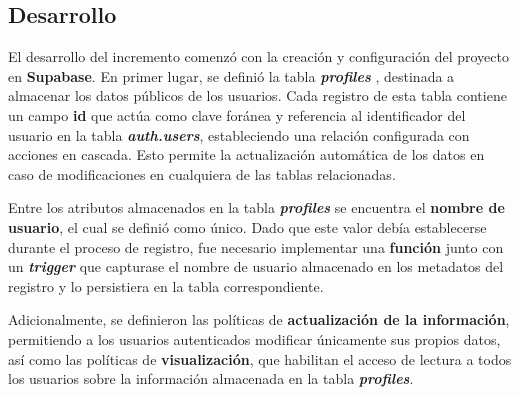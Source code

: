 
\subsection{Desarrollo}
El desarrollo del incremento comenzó con la creación y configuración del proyecto en \textbf{Supabase}. En primer lugar, se definió la tabla \textbf{\textit{profiles}} , destinada a almacenar los datos públicos de los usuarios. Cada registro de esta tabla contiene un campo \textbf{id} que actúa como clave foránea y referencia al identificador del usuario en la tabla \textbf{\textit{auth.users}}, estableciendo una relación configurada con acciones en cascada. Esto permite la actualización automática de los datos en caso de modificaciones en cualquiera de las tablas relacionadas.

Entre los atributos almacenados en la tabla \textbf{\textit{profiles}} se encuentra el \textbf{nombre de usuario}, el cual se definió como único. Dado que este valor debía establecerse durante el proceso de registro, fue necesario implementar una \textbf{función}  junto con un \textbf{\textit{trigger}}  que capturase el nombre de usuario almacenado en los metadatos del registro y lo persistiera en la tabla correspondiente.

Adicionalmente, se definieron las políticas  de \textbf{actualización de la información}, permitiendo a los usuarios autenticados modificar únicamente sus propios datos, así como las políticas de \textbf{visualización}, que habilitan el acceso de lectura a todos los usuarios sobre la información almacenada en la tabla \textbf{\textit{profiles}}.

